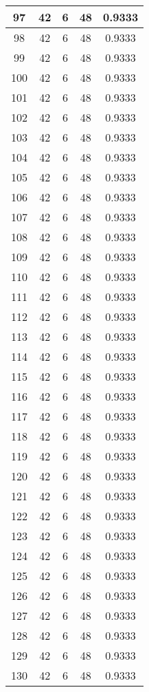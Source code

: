 \documentclass[letterpaper, 12pt]{article}
\begin{document}
\begin{longtable}{|c|c|c|c|c|}
\hline
97 & 42 & 6 & 48 & 0.9333 \\
\hline
98 & 42 & 6 & 48 & 0.9333 \\
\hline
99 & 42 & 6 & 48 & 0.9333 \\
\hline
100 & 42 & 6 & 48 & 0.9333 \\
\hline
101 & 42 & 6 & 48 & 0.9333 \\
\hline
102 & 42 & 6 & 48 & 0.9333 \\
\hline
103 & 42 & 6 & 48 & 0.9333 \\
\hline
104 & 42 & 6 & 48 & 0.9333 \\
\hline
105 & 42 & 6 & 48 & 0.9333 \\
\hline
106 & 42 & 6 & 48 & 0.9333 \\
\hline
107 & 42 & 6 & 48 & 0.9333 \\
\hline
108 & 42 & 6 & 48 & 0.9333 \\
\hline
109 & 42 & 6 & 48 & 0.9333 \\
\hline
110 & 42 & 6 & 48 & 0.9333 \\
\hline
111 & 42 & 6 & 48 & 0.9333 \\
\hline
112 & 42 & 6 & 48 & 0.9333 \\
\hline
113 & 42 & 6 & 48 & 0.9333 \\
\hline
114 & 42 & 6 & 48 & 0.9333 \\
\hline
115 & 42 & 6 & 48 & 0.9333 \\
\hline
116 & 42 & 6 & 48 & 0.9333 \\
\hline
117 & 42 & 6 & 48 & 0.9333 \\
\hline
118 & 42 & 6 & 48 & 0.9333 \\
\hline
119 & 42 & 6 & 48 & 0.9333 \\
\hline
120 & 42 & 6 & 48 & 0.9333 \\
\hline
121 & 42 & 6 & 48 & 0.9333 \\
\hline
122 & 42 & 6 & 48 & 0.9333 \\
\hline
123 & 42 & 6 & 48 & 0.9333 \\
\hline
124 & 42 & 6 & 48 & 0.9333 \\
\hline
125 & 42 & 6 & 48 & 0.9333 \\
\hline
126 & 42 & 6 & 48 & 0.9333 \\
\hline
127 & 42 & 6 & 48 & 0.9333 \\
\hline
128 & 42 & 6 & 48 & 0.9333 \\
\hline
129 & 42 & 6 & 48 & 0.9333 \\
\hline
130 & 42 & 6 & 48 & 0.9333 \\

\end{longtable}
\end{document}
